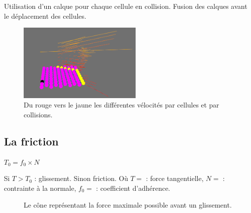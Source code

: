 \documentclass{beamer}
\begin{document}
\begin{frame}
  Utilisation d'un calque pour chaque cellule en collision. Fusion des calques avant le déplacement des cellules.
  \begin{figure}
    \begin{center}
      \includegraphics[width=6cm]{Images/calque.png}
    \end{center}
    \caption{Du rouge vers le jaune les différentes vélocités par cellules et par collisions.}
  \end{figure}
\end{frame}

\subsection{La friction}
\begin{frame}
  \begin{center}
    $T_0 = f_0 \times N$
  \end{center}
  Si $T > T_0$ : glissement. Sinon friction. \smallbreak
  Où $T = $ : force tangentielle, $N = $ : contrainte à la normale, $f_0 = $ : coefficient d'adhérence.
  \begin{figure}
    \begin{center}
    \end{center}
    \caption{Le cône représentant la force maximale possible avant un glissement.}
  \end{figure}
\end{frame}
\end{document}
